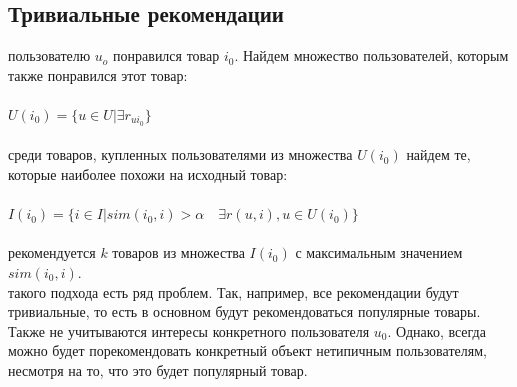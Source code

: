 \documentclass{article}
\newcommand\tab[1][1cm]{\hspace*{#1}}
\begin{document}
\subsection{Тривиальные рекомендации}
 пользователю ﻿$u_o$ понравился товар $i_0$. Найдем множество пользователей, которым также понравился этот товар:\\
\\
\tab$U(i_0)=\{u\in U|\exists r_{ui_0}\}$\\
\\
 среди товаров, купленных пользователями из множества ﻿$U(i_0)$ найдем те, которые наиболее похожи на исходный товар:\\
\\
\tab$I(i_0)=\{i\in I|sim(i_0, i)>\alpha \quad \exists r(u, i), u\in U(i_0)\}$\\
\\
 рекомендуется ﻿$k$ товаров из множества ﻿$I(i_0)$ с максимальным значением $sim(i_0,i)$.\\
 такого подхода есть ряд проблем. Так, например, все рекомендации будут тривиальные, то есть в основном будут рекомендоваться популярные товары. Также не учитываются интересы конкретного пользователя ﻿$u_0$. Однако, всегда можно будет порекомендовать конкретный объект нетипичным пользователям, несмотря на то, что это будет популярный товар.
\end{document}
